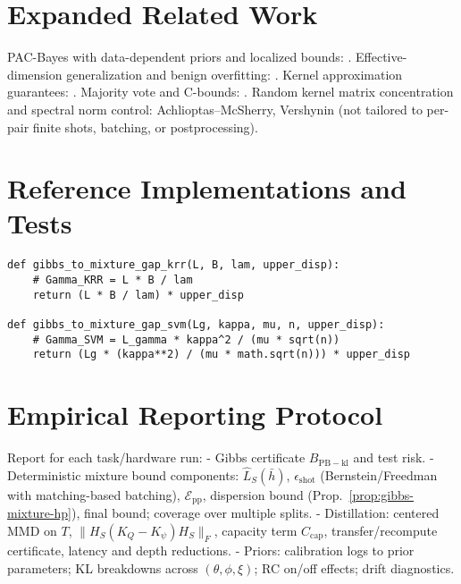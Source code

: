 \documentclass{article}
\begin{document}
\section{Expanded Related Work}\label{app:related}
PAC-Bayes with data-dependent priors and localized bounds: \cite{lever2013tighter, rivasplata2020pacbayes, dziugaite2021role}. Effective-dimension generalization and benign overfitting: \cite{hsu2014random, bartlett2020benign}. Kernel approximation guarantees: \cite{bach2013sharp, rudi2015less}. Majority vote and C-bounds: \cite{germain2015risk}. Random kernel matrix concentration and spectral norm control: Achlioptas–McSherry, Vershynin (not tailored to per-pair finite shots, batching, or postprocessing).

\section{Reference Implementations and Tests}
\begin{lstlisting}[style=py, caption={Gibbs-to-mixture gap constants and plug-in expectation.}]
def gibbs_to_mixture_gap_krr(L, B, lam, upper_disp):
    # Gamma_KRR = L * B / lam
    return (L * B / lam) * upper_disp

def gibbs_to_mixture_gap_svm(Lg, kappa, mu, n, upper_disp):
    # Gamma_SVM = L_gamma * kappa^2 / (mu * sqrt(n))
    return (Lg * (kappa**2) / (mu * math.sqrt(n))) * upper_disp
\end{lstlisting}

\section{Empirical Reporting Protocol}
Report for each task/hardware run:
- Gibbs certificate $B_{\mathrm{PB-kl}}$ and test risk.
- Deterministic mixture bound components: $\hat{L}_S(\bar{h})$, $\epsilon_{\mathrm{shot}}$ (Bernstein/Freedman with matching-based batching), $\mathcal{E}_{\mathrm{pp}}$, dispersion bound (Prop.~\ref{prop:gibbs-mixture-hp}), final bound; coverage over multiple splits.
- Distillation: centered MMD on $T$, $\|H_S(K_Q-K_\psi)H_S\|_F$, capacity term $C_{\mathrm{cap}}$, transfer/recompute certificate, latency and depth reductions.
- Priors: calibration logs to prior parameters; KL breakdowns across $(\theta,\phi,\xi)$; RC on/off effects; drift diagnostics.
\end{document}
